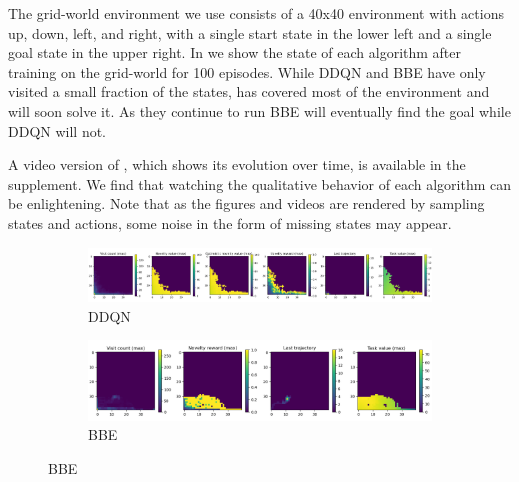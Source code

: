 \clearpage
\begin{subappendices}
 \label{sec:gridworld-vis}

The grid-world environment we use consists of a 40x40 environment with actions up, down, left, and right, with a single start state in the lower left and a single goal state in the upper right.
In  we show the state of each algorithm after training on the grid-world for 100 episodes.
While DDQN and BBE have only visited a small fraction of the states, \algshort{} has covered most of the environment and will soon solve it.
As they continue to run BBE will eventually find the goal while DDQN will not.

A video version of , which shows its evolution over time, is available in the supplement.
We find that watching the qualitative behavior of each algorithm can be enlightening.
Note that as the figures and videos are rendered by sampling states and actions, some noise in the form of missing states may appear.

\begin{figure}[h]
    \centering
    \begin{subfigure}[b]{\textwidth}
        \centering
        \includegraphics[height=0.15\textwidth]{figures/deep/gridworld_100_ddqn.png}
        \caption{DDQN}
    \end{subfigure}

    \begin{subfigure}[b]{\textwidth}
        \centering
        \includegraphics[height=0.15\textwidth]{figures/deep/gridworld_100_bbe.png}
        \caption{BBE}
    \end{subfigure}


\end{figure}
\end{subappendices}
